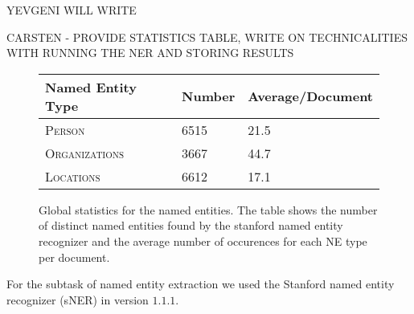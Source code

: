 
YEVGENI WILL WRITE

CARSTEN - PROVIDE STATISTICS TABLE, WRITE ON TECHNICALITIES WITH RUNNING THE NER AND STORING RESULTS
\begin{figure}[ht]
\centering
\caption{Global statistics for the named entities. The table shows the number of distinct named
entities found by the stanford named entity recognizer and the average number of occurences for
each NE type per document.}
\begin{tabular}{l|ll}
  Named Entity Type      & Number & Average/Document\\
  \hline
  \textsc{Person}        & 6515   & 21.5\\
  \textsc{Organizations} & 3667   & 44.7\\
  \textsc{Locations}     & 6612   & 17.1\\
\end{tabular}
\label{fig:ne_statistics}
\end{figure}

For the subtask of named entity extraction we used the Stanford named entity recognizer (sNER) in
version $1.1.1$.